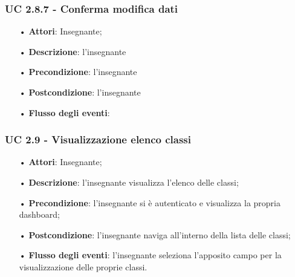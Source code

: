 \subsubsection{UC 2.8.7 - Conferma modifica dati}
\begin{itemize}
	\item[•] \textbf{Attori}: Insegnante;
	\item[•] \textbf{Descrizione}: l'insegnante
	\item[•] \textbf{Precondizione}: l'insegnante
	\item[•] \textbf{Postcondizione}: l'insegnante
	\item[•] \textbf{Flusso degli eventi}: 
\end{itemize}
















\subsubsection{UC 2.9 - Visualizzazione elenco classi}
\begin{itemize}
	\item[•] \textbf{Attori}: Insegnante;
	\item[•] \textbf{Descrizione}: l'insegnante visualizza l'elenco delle classi;
	\item[•] \textbf{Precondizione}: l'insegnante si è autenticato e visualizza la propria dashboard;
	\item[•] \textbf{Postcondizione}: l'insegnante naviga all'interno della lista delle classi;
	\item[•] \textbf{Flusso degli eventi}: l'insegnante seleziona l'apposito campo per la visualizzazione delle proprie classi.
\end{itemize}

